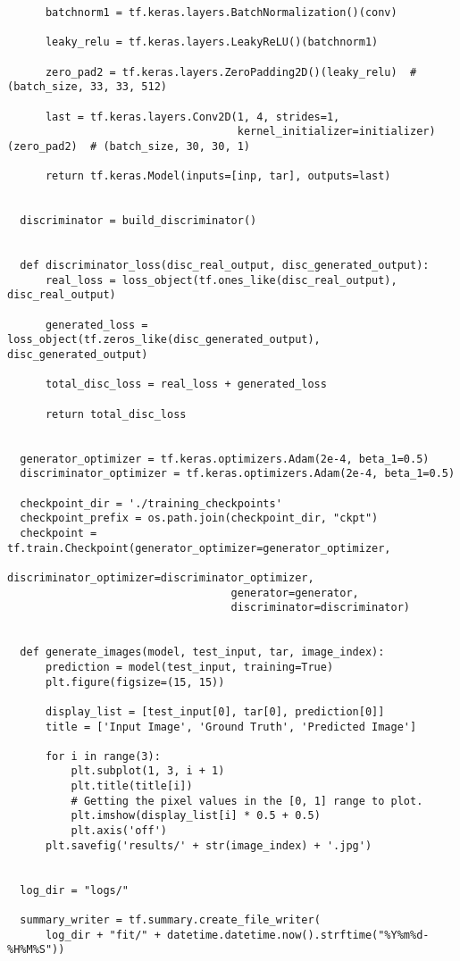 \begin{lstlisting}
      batchnorm1 = tf.keras.layers.BatchNormalization()(conv)

      leaky_relu = tf.keras.layers.LeakyReLU()(batchnorm1)

      zero_pad2 = tf.keras.layers.ZeroPadding2D()(leaky_relu)  # (batch_size, 33, 33, 512)

      last = tf.keras.layers.Conv2D(1, 4, strides=1,
                                    kernel_initializer=initializer)(zero_pad2)  # (batch_size, 30, 30, 1)

      return tf.keras.Model(inputs=[inp, tar], outputs=last)


  discriminator = build_discriminator()


  def discriminator_loss(disc_real_output, disc_generated_output):
      real_loss = loss_object(tf.ones_like(disc_real_output), disc_real_output)

      generated_loss = loss_object(tf.zeros_like(disc_generated_output), disc_generated_output)

      total_disc_loss = real_loss + generated_loss

      return total_disc_loss


  generator_optimizer = tf.keras.optimizers.Adam(2e-4, beta_1=0.5)
  discriminator_optimizer = tf.keras.optimizers.Adam(2e-4, beta_1=0.5)

  checkpoint_dir = './training_checkpoints'
  checkpoint_prefix = os.path.join(checkpoint_dir, "ckpt")
  checkpoint = tf.train.Checkpoint(generator_optimizer=generator_optimizer,
                                   discriminator_optimizer=discriminator_optimizer,
                                   generator=generator,
                                   discriminator=discriminator)


  def generate_images(model, test_input, tar, image_index):
      prediction = model(test_input, training=True)
      plt.figure(figsize=(15, 15))

      display_list = [test_input[0], tar[0], prediction[0]]
      title = ['Input Image', 'Ground Truth', 'Predicted Image']

      for i in range(3):
          plt.subplot(1, 3, i + 1)
          plt.title(title[i])
          # Getting the pixel values in the [0, 1] range to plot.
          plt.imshow(display_list[i] * 0.5 + 0.5)
          plt.axis('off')
      plt.savefig('results/' + str(image_index) + '.jpg')


  log_dir = "logs/"

  summary_writer = tf.summary.create_file_writer(
      log_dir + "fit/" + datetime.datetime.now().strftime("%Y%m%d-%H%M%S"))



\end{lstlisting}
